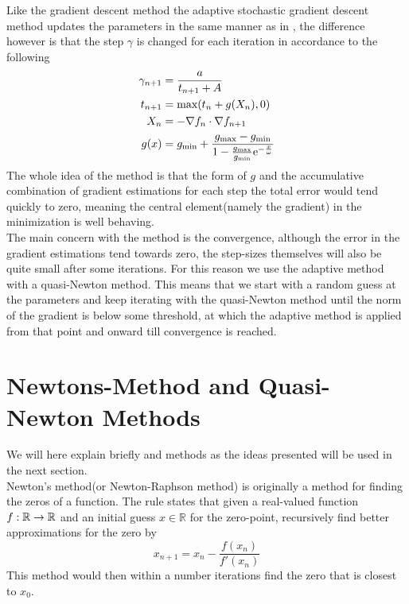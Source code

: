     Like the gradient descent method the adaptive stochastic gradient descent
    method updates the parameters in the same manner as in ,
    the difference however is that the step $\gamma$ is changed for each
    iteration in accordance to the following
        \begin{equation}
            \begin{aligned}
                \gamma_{n+1} &= \frac{a}{t_{n+1} + A} \\
                t_{n+1} &= \text{max}(t_n + g(X_n), 0) \\
                X_n &= - \nabla f_n \cdot \nabla f_{n+1} \\
                g(x) &= g_{\text{min}} + \frac{g_{\text{max}} -
                g_{\text{min}}}{1 - \frac{g_{\text{max}}}{g_{\text{min}}}
                \mathrm{e}^{-\frac{x}{\omega}}}
            \end{aligned}
        \end{equation}
    The whole idea of the method is that the form of $g$ and the accumulative
    combination of gradient estimations for each step the total error would
    tend quickly to zero, meaning the central element(namely the gradient) in
    the minimization is well behaving. \\

    The main concern with the method is the convergence, although the error in
    the gradient estimations tend towards zero, the step-sizes themselves will
    also be quite small after some iterations. For this reason we use the
    adaptive method with a quasi-Newton method. This means that we start with a
    random guess at the parameters and keep iterating with the quasi-Newton
    method until the norm of the gradient is below some threshold, at which the
    adaptive method is applied from that point and onward till convergence is
    reached.

\section{Newtons-Method and Quasi-Newton
Methods\label{sec:newtons-method_and_quasi-newton_methods}}
    We will here explain briefly  and
     methods as the ideas presented will be used in the
    next section. \\

    Newton's method\cite{linalgDavid}(or Newton-Raphson method) is originally a
    method for finding the zeros of a function. The rule states that given a
    real-valued function $f:\mathbb{R}\rightarrow\mathbb{R}$ and an initial guess
    $x\in\mathbb{R}$ for the zero-point, recursively find better
    approximations for the zero by
        \begin{equation}
            x_{n+1} = x_n - \frac{f(x_n)}{f'(x_n)}
        \end{equation}
    This method would then within a number iterations find the zero that is
    closest to $x_0$.

